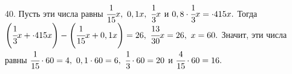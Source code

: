 40. Пусть эти числа равны $\cfrac{1}{15}x,\ 0,1x,\ \cfrac{1}{3}x$ и $0,8\cdot\cfrac{1}{3}x=\cdot{4}{15}x.$ Тогда $\left(\cfrac{1}{3}x+\cdot{4}{15}x\right)-
\left(\cfrac{1}{15}x+0,1x\right)=26,\ \cfrac{13}{30}x=26,\ x=60.$ Значит, эти числа равны $\cfrac{1}{15}\cdot60=4,\ 0,1\cdot60=6,\ \cfrac{1}{3}\cdot60=20$ и $\cfrac{4}{15}\cdot60=16.$\\
